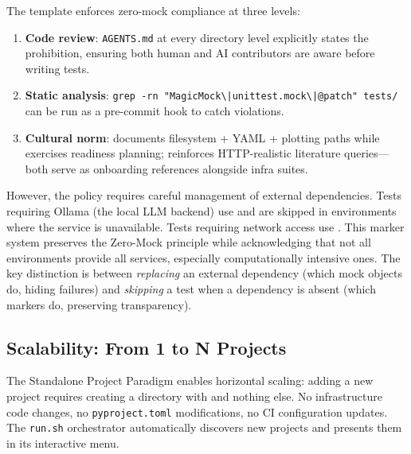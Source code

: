 \documentclass[
  english,
]{article}
\providecommand{\tightlist}{%
  \setlength{\itemsep}{0pt}\setlength{\parskip}{0pt}}
\begin{document}
The template enforces zero-mock compliance at three levels:

\begin{enumerate}
\def\labelenumi{\arabic{enumi}.}
\tightlist
\item
  \textbf{Code review}: \texttt{AGENTS.md} at every directory level
  explicitly states the prohibition, ensuring both human and AI
  contributors are aware before writing tests.
\item
  \textbf{Static analysis}:
  \texttt{grep\ -rn\ "MagicMock\textbackslash{}|{}unittest.mock\textbackslash{}|{}@patch"\ tests/}
  can be run as a pre-commit hook to catch violations.
\item
  \textbf{Cultural norm}:  documents
  filesystem + YAML + plotting paths while
   exercises readiness planning;
   reinforces HTTP-realistic
  literature queries---both serve as onboarding references alongside
  infra suites.
\end{enumerate}

However, the policy requires careful management of external
dependencies. Tests requiring Ollama (the local LLM backend) use
 and are skipped in environments
where the service is unavailable. Tests requiring network access use
. This marker system preserves the
Zero-Mock principle while acknowledging that not all environments
provide all services, especially computationally intensive ones. The key
distinction is between \emph{replacing} an external dependency (which
mock objects do, hiding failures) and \emph{skipping} a test when a
dependency is absent (which markers do, preserving transparency).

\newpage

\subsection{Scalability: From 1 to N
Projects}\label{scalability-from-1-to-n-projects}

The Standalone Project Paradigm enables horizontal scaling: adding a new
project requires creating a directory with
 and nothing else. No infrastructure code
changes, no \texttt{pyproject.toml} modifications, no CI configuration
updates. The \texttt{run.sh} orchestrator automatically discovers new
projects and presents them in its interactive menu.
\end{document}
